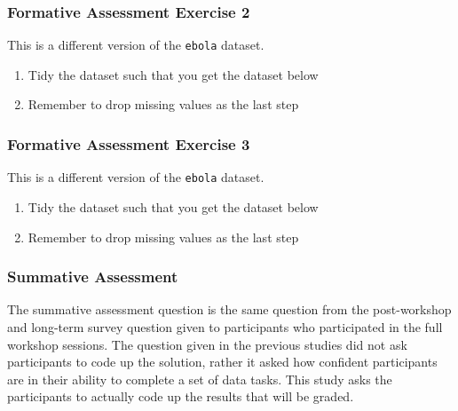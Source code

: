 \documentclass[acmsmall]{acmart}
\newcommand{\code}[1]{\lstinline{#1}}
\begin{document}
\subsubsection{Formative Assessment Exercise 2}
\begin{displayquote}
	
	This is a different version of the \code{ebola} dataset.
	
	\begin{enumerate}
		\item Tidy the dataset such that you get the dataset below
		\item Remember to drop missing values as the last step
	\end{enumerate}
	
\end{displayquote}

\subsubsection{Formative Assessment Exercise 3}

\begin{displayquote}
	
	This is a different version of the \code{ebola} dataset.
	
	\begin{enumerate}
		\item Tidy the dataset such that you get the dataset below
		\item Remember to drop missing values as the last step
	\end{enumerate}
	
\end{displayquote}

\subsubsection{Summative Assessment}

The summative assessment question is the same question from the post-workshop and long-term survey question
given to participants who participated in the full workshop sessions.
The question given in the previous studies did not ask participants to code up the solution,
rather it asked how confident participants are in their ability to complete a set of data tasks.
This study asks the participants to actually code up the results that will be graded.
\end{document}
